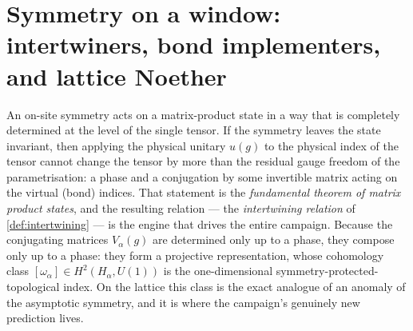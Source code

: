 \section{Symmetry on a window: intertwiners, bond implementers, and lattice
Noether}
\label{sec:symmetry-noether}

An on-site symmetry acts on a matrix-product state in a way that is completely
determined at the level of the single tensor. If the symmetry leaves the state
invariant, then applying the physical unitary $u(g)$ to the physical index of
the tensor cannot change the tensor by more than the residual gauge freedom of
the parametrisation: a phase and a conjugation by some invertible matrix acting
on the virtual (bond) indices. That statement is the \emph{fundamental theorem
of matrix product states}, and the resulting relation --- the
\emph{intertwining relation} of \cref{def:intertwining} --- is the engine that
drives the entire campaign. Because the conjugating matrices $V_{\alpha}(g)$
are determined only up to a phase, they compose only up to a phase: they form
a projective representation, whose cohomology class
$[\omega_{\alpha}] \in H^{2}(H_{\alpha}, U(1))$ is the one-dimensional
symmetry-protected-topological index. On the lattice this class is the exact
analogue of an anomaly of the asymptotic symmetry, and it is where the
campaign's genuinely new prediction lives.

